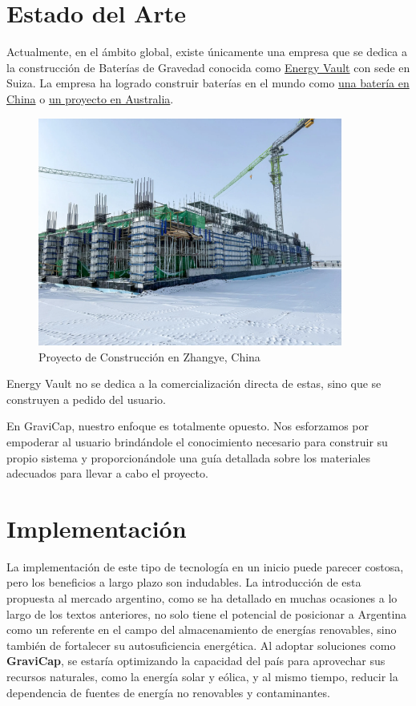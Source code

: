         \section{Estado del Arte}
            Actualmente, en el ámbito global, existe únicamente una empresa que se dedica a la construcción de Baterías de Gravedad conocida como \href{https://www.energyvault.com}{Energy Vault} con sede en Suiza. La empresa ha logrado construir baterías en el mundo como \href{https://www.energyvault.com/projects/zhangye}{una batería en China} o \href{https://www.renewableenergyworld.com/storage/energy-vault-lands-partnership-for-building-based-gravity-storage/}{un proyecto en Australia}.\par
            \begin{figure} [ht]
                \centering
                \includegraphics [width=10cm]{Imagenes/Introducción/Zhangye.jpg}
                \caption{Proyecto de Construcción en Zhangye, China}
                \label{fig:Zhangye}
            \end{figure}
            Energy Vault no se dedica a la comercialización directa de estas, sino que se construyen a pedido del usuario.\par
            En \textcolor{dark_violet}{GraviCap}, nuestro enfoque es totalmente opuesto. Nos esforzamos por empoderar al usuario brindándole el conocimiento necesario para construir su propio sistema y proporcionándole una guía detallada sobre los materiales adecuados para llevar a cabo el proyecto.\par

        \section{Implementación}
            La implementación de este tipo de tecnología en un inicio puede parecer costosa, pero los beneficios a largo plazo son indudables. La introducción de esta propuesta al mercado argentino, como se ha detallado en muchas ocasiones a lo largo de los textos anteriores, no solo tiene el potencial de posicionar a Argentina como un referente en el campo del almacenamiento de energías renovables, sino también de fortalecer su autosuficiencia energética. Al adoptar soluciones como \textcolor{dark_violet}{\textbf{GraviCap}}, se estaría optimizando la capacidad del país para aprovechar sus recursos naturales, como la energía solar y eólica, y al mismo tiempo, reducir la dependencia de fuentes de energía no renovables y contaminantes.\par
        
